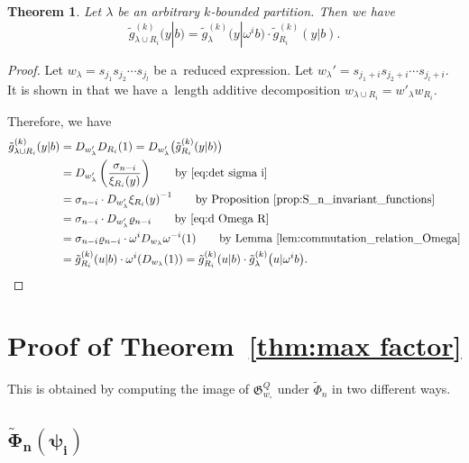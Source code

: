 \documentclass[pdftex]{sigma}
\numberwithin{equation}{section}
\newcommand{\co}{\xi}
\newcommand{\la}{\lambda}
\newcommand{\de}{\varrho}
\newcommand{\fac}{\psi}
\newtheorem{Theorem}{Theorem}[section]
\theoremstyle{definition}
\begin{document}
\begin{Theorem}\label{thm:$k$-rect}
Let $\lambda$ be an arbitrary $k$-bounded partition.
Then we have
\[
\tilde{g}^{(k)}_{\lambda\cup R_i}(y|b)=
\tilde{g}^{(k)}_{\lambda}\bigl(y| \omega^{i}b\bigr)\cdot\tilde{g}^{(k)}_{R_i}(y|b).
\]
\end{Theorem}
\begin{proof}
Let $w_\lambda=s_{j_1}s_{j_2}\cdots s_{j_l}$ be a~reduced expression.
Let $w_\la'=s_{j_1+i}s_{j_2+i}\cdots s_{j_l+i}$.
It is shown in \cite[Lemma~2.15]{Tak} that we have a~length additive decomposition
$
w_{\la \cup R_i}=w'_\la w_{R_i}$.

Therefore, we have
\begin{align*}
\tilde{g}^{(k)}_{\lambda\cup R_i}(y|b)&=D_{w'_\la}D_{R_i}(1)=D_{w'_\la}\bigl(\tilde{g}^{(k)}_{R_i}(y|b)\bigr)
\\
&=D_{w'_\la}\left(\frac{\sigma_{n-i}}{\co_{R_i}(y)}\right)\qquad\text{by~\eqref{eq:det sigma i}}\\
&=\sigma_{n-i}\cdot D_{w'_\la}{\co_{R_i}(y)}^{-1}\qquad\text{by Proposition~\ref{prop:S_n_invariant_functions}}
\\
&=\sigma_{n-i}\cdot D_{w'_\la}\de_{n-i}\qquad\text{by~\eqref{eq:d Omega R}}\\
&=\sigma_{n-i} \de_{n-i}\cdot \omega^{i} D_{w_\la}\omega^{-i}(1)
\qquad\text{by Lemma~\ref{lem:commutation_relation_Omega}}
\\
&=\tilde{g}^{(k)}_{R_i}
(u|b)
\cdot \omega^{i}( D_{w_\la}(1))=\tilde{g}^{(k)}_{R_i}
(u|b)
\cdot \tilde{g}^{(k)}_{\la}
\bigl(u| \omega^i b\bigr).\tag*{\qed}
 \end{align*}\renewcommand{\qed}{}
\end{proof}



\section{Proof of Theorem~\ref{thm:max factor}}\label{sec:max factor}



This is obtained by computing the image of $\mathfrak{G}_{w_\circ}^Q$
under $\tilde{\Phi}_n$ in two different ways.

\subsection[Phi\_n(fac\_i)]{$\boldsymbol{\tilde{\Phi}_n(\fac_i)}$}
\end{document}
